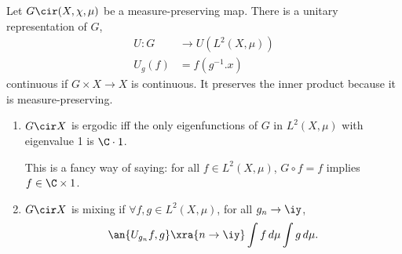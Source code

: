 Let $G\cir (X,\chi, \mu)$ be a measure-preserving map. There is a unitary representation of $G$, 
\begin{align}
U: G &\to U(L^2(X,\mu))\\
U_g(f) &=f(g^{-1}.x) %
\end{align}
continuous if $G\times X\to X$ is continuous.
It preserves the inner product because it is measure-preserving.
\begin{rem}%
\begin{enumerate}
\item
$G\cir X$ is ergodic iff the only eigenfunctions of $G$ in $L^2(X,\mu)$ with eigenvalue 1 is $\C\cdot 1$. %

This is a fancy way of saying: for all $f\in L^2(X,\mu)$, $G\circ f = f$ implies $f\in \C\times 1$.
\item
$G\cir X$ is mixing if $\forall f,g\in L^2(X,\mu)$,  for all $g_n\to \iy$,
\begin{align}
\an{U_{g_n}f,g} \xra{n\to \iy} \int f\,d\mu\int g\,d\mu.
\end{align}
\end{enumerate}

\end{rem}